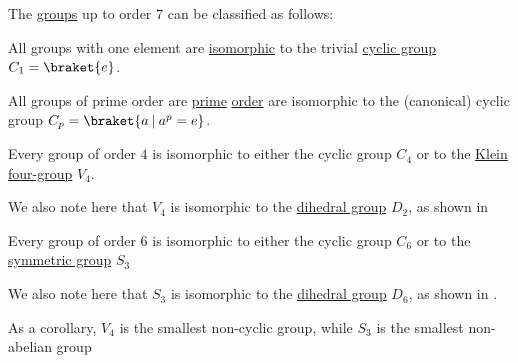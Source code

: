 \begin{proposition}\label{thm:clasification_of_small_groups}
  The \hyperref[def:group]{groups} up to order \( 7 \) can be classified as follows:
  \begin{thmenum}
     All groups with one element are \hyperref[def:group/homomorphism]{isomorphic} to the trivial \hyperref[def:cyclic_group]{cyclic group} \( C_1 = \braket{ e } \).

     All groups of prime order are \hyperref[def:prime_number]{prime} \hyperref[def:group_order]{order} are isomorphic to the (canonical) cyclic group \( C_p = \braket{ a \given a^p = e } \).

     Every group of order \( 4 \) is isomorphic to either the cyclic group \( C_4 \) or to the \hyperref[def:klein_four_group]{Klein four-group} \( V_4 \).

    We also note here that \( V_4 \) is isomorphic to the \hyperref[def:dihedral_group]{dihedral group} \( D_2 \), as shown in 

     Every group of order \( 6 \) is isomorphic to either the cyclic group \( C_6 \) or to the \hyperref[def:symmetric_group]{symmetric group} \( S_3 \)

    We also note here that \( S_3 \) is isomorphic to the \hyperref[def:dihedral_group]{dihedral group} \( D_6 \), as shown in .
  \end{thmenum}
\end{proposition}
\begin{comments}
  \item As a corollary, \( V_4 \) is the smallest non-cyclic group, while \( S_3 \) is the smallest non-abelian group
\end{comments}
